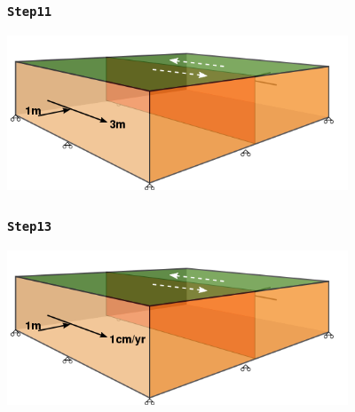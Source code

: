 \documentclass{beamer}
\begin{document}
\begin{frame}
  \frametitle{{\tt Step11}}

  \begin{center}
    \includegraphics[width=4.0in]{figs/step11_schematic}
  \end{center}
  
\end{frame}


\begin{frame}
  \frametitle{{\tt Step13}}
  
  \begin{center}
    \includegraphics[width=4.0in]{figs/step13_schematic}
  \end{center}
  
\end{frame}


\end{document}
